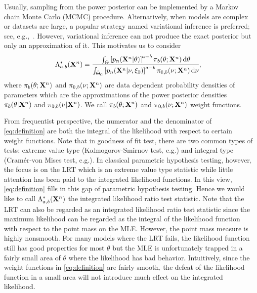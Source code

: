 \documentclass[11pt]{article}
\theoremstyle{plain}
\theoremstyle{definition}
\theoremstyle{remark}
\begin{document}
Usually, sampling from the power posterior can be implemented by a Markov chain Monte Carlo (MCMC) procedure.
Alternatively, when models are complex or datasets are large, a popular strategy named variational inference is preferred; see, e.g.,~\cite{blei2017}.
However, variational inference can not produce the exact posterior but only an approximation of it.
This motivates us to consider
\begin{equation}
    \Lambda^*_{a,b} (\mathbf{X}^n) = \frac{\int_{\Theta} \left[p_n(\mathbf{X}^{n}|\theta)\right]^{a-b}\pi_b (\theta;\mathbf{X}^{n})\,\mathrm d\theta}{\int_{\tilde{\Theta}_0} \left[p_n(\mathbf{X}^{n}|\nu,\xi_0)\right]^{a-b}\pi_{0,b}(\nu;\mathbf{X}^{n})\, \mathrm d\nu},
\label{eq:definition}
\end{equation}
where $\pi_b(\theta;\mathbf{X}^{n})$ and $\pi_{0,b}(\nu;\mathbf{X}^{n})$ are data dependent probability densities of parameters which are the approximations of the power posterior densities $\pi_b(\theta | \mathbf{X}^{n})$ and $\pi_{0,b}(\nu | \mathbf{X}^{n})$.
We call $\pi_b(\theta;\mathbf{X}^{n})$ and $\pi_{0,b}(\nu;\mathbf{X}^{n})$ weight functions.

From frequentist perspective, the numerator and the denominator of \eqref{eq:definition} are both the integral of the likelihood with respect to certain weight functions.
Note that in goodness of fit test, there are two common types of tests: extreme value type (Kolmogorov-Smirnov test, e.g.) and integral type (Cram\'er-von Mises test, e.g.).
In classical parametric hypothesis testing, however, the focus is on the LRT which is an extreme value type statistic while little attention has been paid to the integrated likelihood functions.
In this view, \eqref{eq:definition} fills in this gap of parametric hypothesis testing.
Hence we would like to call $\Lambda_{a,b}^*(\mathbf{X}^n )$ the integrated likelihood ratio test statistic.
Note that the LRT can also be regarded as an integrated likelihood ratio test statistic since the maximum likelihood can be regarded as the integral of the likelihood function with respect to the point mass on the MLE.
However, the point mass measure is highly nonsmooth.
For many models where the LRT fails, the likelihood function still has good properties for most $\theta$ but the MLE is unfortunately trapped in a fairly small area of $\theta$ where the likelihood has bad behavior.
Intuitively, since the weight functions in \eqref{eq:definition} are fairly smooth,
the defeat of the likelihood function in a small area will not introduce much effect on the integrated likelihood.
\end{document}
